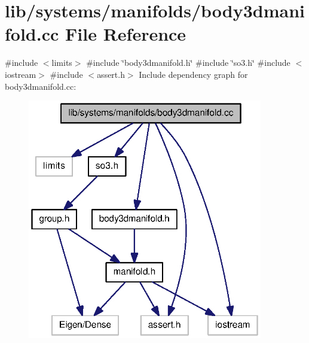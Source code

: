 \section{lib/systems/manifolds/body3dmanifold.cc \-File \-Reference}
\label{body3dmanifold_8cc}
{\ttfamily \#include $<$limits$>$}\*
{\ttfamily \#include \char`\"{}body3dmanifold.\-h\char`\"{}}\*
{\ttfamily \#include \char`\"{}so3.\-h\char`\"{}}\*
{\ttfamily \#include $<$iostream$>$}\*
{\ttfamily \#include $<$assert.\-h$>$}\*
\-Include dependency graph for body3dmanifold.\-cc\-:
\nopagebreak
\begin{figure}[H]
\begin{center}
\leavevmode
\includegraphics[width=291pt]{body3dmanifold_8cc__incl}
\end{center}
\end{figure}
